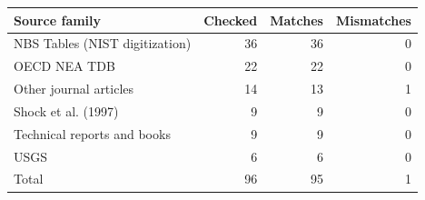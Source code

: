 \begin{tabular}{lrrr}
\toprule
Source family & Checked & Matches & Mismatches \\
\midrule
NBS Tables (NIST digitization) & 36 & 36 & 0 \\
OECD NEA TDB & 22 & 22 & 0 \\
Other journal articles & 14 & 13 & 1 \\
Shock et al. (1997) & 9 & 9 & 0 \\
Technical reports and books & 9 & 9 & 0 \\
USGS & 6 & 6 & 0 \\
\midrule
Total & 96 & 95 & 1 \\
\bottomrule
\end{tabular}
